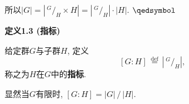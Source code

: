 \documentclass[UTF8]{ctexart}
\begin{document}
\vspace{6pt}
所以$|G|=\left|\,\!^{\displaystyle G}\!/_{\displaystyle H}\times H\right|
=\left|\,\!^{\displaystyle G}\!/_{\displaystyle H}\right|\cdot|H|$.
\hfill $\qedsymbol$

\vspace{15pt}

\hypertarget{sec:定义1.3}{}
\noindent\textbf{定义1.3 (指标)}

给定群$G$与子群$H$, 定义
\[
    [G:H]\,\overset{\mathrm{def}}{=}\,
    \left|\,\!^{\displaystyle G}\!/_{\displaystyle H}\right|,
\]
称之为$H$在$G$中的\textbf{指标}.

显然当$G$有限时, $[G:H]=|G|\,/\,|H|$.
\end{document}
